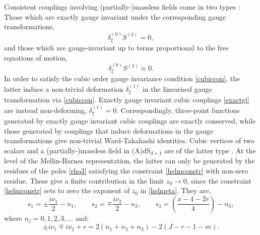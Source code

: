 \documentclass[11pt,a4paper]{article}
\begin{document}
 
Consistent couplings involving (partially-)massless fields come in two types \cite{Berends:1984rq}: Those which are exactly gauge invariant under the corresponding gauge transformations,
\begin{equation}\label{exactgi}
    \delta^{\left(0\right)}_{\xi}S^{(3)} = 0,
\end{equation}
and those which are gauge-invariant up to terms proportional to the free equations of motion,
\begin{equation}\label{nonexactgi}
    \delta^{\left(0\right)}_{\xi}S^{(3)} \approx 0.
\end{equation}
In order to satisfy the cubic order gauge invariance condition \eqref{cubiccon}, the latter induce a non-trivial deformation $\delta^{\left(1\right)}_\xi$ in the linearised gauge transformation via \eqref{cubiccon}. Exactly gauge invariant cubic couplings \eqref{exactgi} are instead non-deforming, $\delta^{\left(1\right)}_\xi = 0$. Correspondingly, three-point functions generated by exactly gauge invariant cubic couplings are exactly conserved, while those generated by couplings that induce deformations in the gauge transformations give non-trivial Ward-Takahashi identities. Cubic vertices of two scalars and a (partially-)massless field in (A)dS$_{d+1}$ are of the latter type \cite{Berends:1985xx,Bekaert:2010hk,Joung:2012hz}. At the level of the Mellin-Barnes representation, the latter can only be generated by the residues of the poles \eqref{rho3} satisfying the constraint \eqref{helmconstr} with non-zero residue. These give a finite contribution in the limit $z_0 \to 0$, since the constraint \eqref{helmconstr} sets to zero the exponent of $z_0$ in \eqref{helmeta}. They are, 
\begin{equation}\label{wtpoles}
   s_1 = \pm \frac{i\nu_1}{2}-n_1, \qquad s_2 = \mp \frac{i\nu_2}{2}-n_2, \qquad s_3 =  \left(\frac{x-4-2r}{4}\right)-n_3, 
\end{equation}
where $n_j=0,1,2,3, \ldots$ and:
\begin{equation}\label{relbdryterm}
    \pm i\nu_1 \mp i\nu_2+r=2\left(n_1+n_2+n_3\right)-2\left(J-r-1-m\right).
\end{equation}
\end{document}
